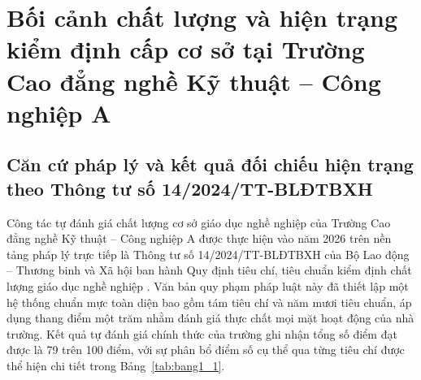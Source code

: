\section{Bối cảnh chất lượng và hiện trạng kiểm định cấp cơ sở tại Trường Cao đẳng nghề Kỹ thuật -- Công nghiệp A}

\subsection{Căn cứ pháp lý và kết quả đối chiếu hiện trạng theo Thông tư số 14/2024/TT-BLĐTBXH}

Công tác tự đánh giá chất lượng cơ sở giáo dục nghề nghiệp của Trường Cao đẳng nghề Kỹ thuật -- Công nghiệp A được thực hiện vào năm 2026 trên nền tảng pháp lý trực tiếp là Thông tư số 14/2024/TT-BLĐTBXH của Bộ Lao động -- Thương binh và Xã hội ban hành Quy định tiêu chí, tiêu chuẩn kiểm định chất lượng giáo dục nghề nghiệp \parencite{bldtbxh2024}. Văn bản quy phạm pháp luật này đã thiết lập một hệ thống chuẩn mực toàn diện bao gồm tám tiêu chí và năm mươi tiêu chuẩn, áp dụng thang điểm một trăm nhằm đánh giá thực chất mọi mặt hoạt động của nhà trường. Kết quả tự đánh giá chính thức của trường ghi nhận tổng số điểm đạt được là 79 trên 100 điểm, với sự phân bổ điểm số cụ thể qua từng tiêu chí được thể hiện chi tiết trong Bảng~\ref{tab:bang1_1}.

